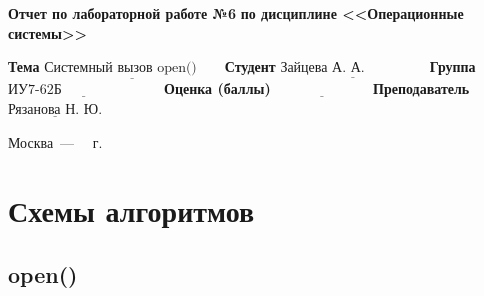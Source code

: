 \documentclass[a4paper,14pt]{extreport}
\begin{document}
\begin{titlepage}
		\begin{center}
			\noindent\begin{minipage}{1.1\textwidth}\centering
				\Large\textbf{  Отчет по лабораторной работе №6}\newline
				\textbf{по дисциплине <<Операционные системы>>}\newline
			\end{minipage}
		\end{center}
		
		\noindent\textbf{Тема} $\underline{\text{Системный вызов open()~~~~~}}$\newline\newline
		\noindent\textbf{Студент} $\underline{\text{Зайцева А. А.~~~~~~~~~~~~~}}$\newline\newline
		\noindent\textbf{Группа} $\underline{\text{ИУ7-62Б~~~~~~~~~~~~~~~~~~~~~}}$\newline\newline
		\noindent\textbf{Оценка (баллы)} $\underline{\text{~~~~~~~~~~~~~~~~~~~~}}$\newline\newline
		\noindent\textbf{Преподаватель} $\underline{\text{Рязанова Н. Ю.}}$\newline\newline\newline
		
		\begin{center}
			\vfill
			Москва~---~\the\year
			~г.
		\end{center}
	\end{titlepage}




\chapter{Схемы алгоритмов}

\section{open()}
\end{document}
